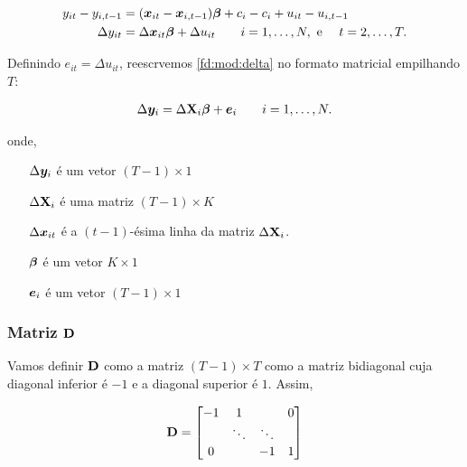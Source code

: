 \documentclass[11pt, oneside, a4paper, article]{article}
\numberwithin{equation}{section}
\begin{document}
\vspace{-2 em}
\begin{align} 
	\notag
y_{it} - y_{i,t-1} &=
(\boldsymbol{x}_{it} - \boldsymbol{x}_{i,t-1}) \boldsymbol{\beta}
+ c_{i} - c_{i} + u_{it} - u_{i,t-1}
\\
\label{fd:mod:delta}
\Delta y_{it} &= \Delta \boldsymbol{x}_{it}\boldsymbol{\beta} + \Delta u_{it}
\qquad i = 1, \dots, N, \text{ e } \quad t = 2, \dots, T.
\end{align}

Definindo 
$e_{it} = \Delta u_{it}$, 
reescrvemos \eqref{fd:mod:delta} no formato matricial empilhando $T$:

\vspace{-1 em}
\begin{align} \label{fd:mod:delta:mat}
\Delta \boldsymbol{y}_{i} = \Delta \mathbf{X}_{i} \boldsymbol{\beta} + \boldsymbol{e}_{i}
\qquad i = 1, \dots, N.
\end{align}

\noindent onde, 
\vspace{-1 ex}
\begin{itemize}\itemsep0pt
  \item[$\Delta \boldsymbol{y}_{i}$] é um vetor $( T - 1 ) \times 1$ 
  \item[$\Delta \mathbf{X}_{i}$] é uma matriz  $( T - 1 ) \times K$
  \item[$\Delta \boldsymbol{x}_{it}$] é a $(t-1)$-ésima linha da matriz $\Delta \mathbf{X}_{i}$.
  \item[$\boldsymbol{\beta}$] é um vetor $K \times 1$
  \item[$\boldsymbol{e}_{i}$] é um vetor $(T - 1 ) \times 1$
\end{itemize}

\subsubsection{Matriz $\mathbf{D}$}

Vamos definir $\mathbf{D}$ como  a matriz $(T-1) \times T$ como a matriz bidiagonal cuja diagonal inferior é $-1$ e a diagonal superior é $1$.
Assim, 

\vspace{-1 em}
\begin{align*}
\mathbf{D} =
\begin{bmatrix}
-1 & 1 &  & 0
\\
& \ddots & \ddots & 
\\
0 & & -1 & 1
\end{bmatrix}
\end{align*}
\end{document}

